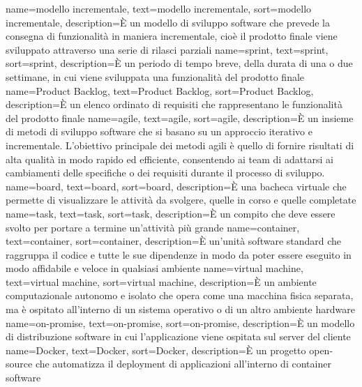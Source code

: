 {
    name={modello incrementale},
    text=modello incrementale,
    sort=modello incrementale,
    description={È un modello di sviluppo software che prevede la consegna di funzionalità in maniera incrementale, cioè il prodotto finale viene 
    sviluppato attraverso una serie di rilasci parziali}
}
{
    name={sprint},
    text=sprint,
    sort=sprint,
    description={È un periodo di tempo breve, della durata di una o due settimane, in cui viene sviluppata 
    una funzionalità del prodotto finale}
}
{
    name={Product Backlog},
    text=Product Backlog,
    sort=Product Backlog,
    description={È un elenco ordinato di requisiti che rappresentano le funzionalità del prodotto finale}
}
{
    name={agile},
    text=agile,
    sort=agile,
    description={È un insieme di metodi di sviluppo software che si basano su un approccio iterativo e incrementale. 
    L'obiettivo principale dei metodi agili è quello di fornire risultati di alta qualità in modo rapido ed efficiente, consentendo ai team di adattarsi ai cambiamenti delle specifiche o dei requisiti durante il processo di sviluppo.}
}
{
    name={board},
    text=board,
    sort=board,
    description={È una bacheca virtuale che permette di visualizzare le attività da svolgere, quelle in corso e quelle completate}
}
{
    name={task},
    text=task,
    sort=task,
    description={È un compito che deve essere svolto per portare a termine un'attività più grande}
}
{
    name={container},
    text=container,
    sort=container,
    description={È un'unità software standard che raggruppa il codice e tutte le sue dipendenze in modo da poter essere eseguito in modo affidabile e veloce in qualsiasi ambiente}
}
{
    name={virtual machine},
    text=virtual machine,
    sort=virtual machine,
    description={È un ambiente computazionale autonomo e isolato che opera come una macchina fisica separata, ma è ospitato all'interno di un sistema operativo o di un altro ambiente hardware}
}
{
    name={on-promise},
    text=on-promise,
    sort=on-promise,
    description={È un modello di distribuzione software in cui l'applicazione viene ospitata sul server del cliente}
}
{
    name={Docker},
    text=Docker,
    sort=Docker,
    description={È un progetto open-source che automatizza il deployment di applicazioni all'interno di container software}
}
